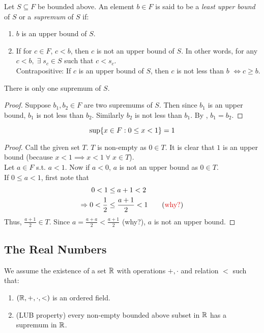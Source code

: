\documentclass[12pt]{article}
\begin{document}
\begin{defn} \label{defn:supremum}
    Let $S \subseteq F$ be bounded above. An element $b \in F$ is said to be a \emph{least upper bound} of $S$ or a \emph{supremum} of $S$ if:
    \begin{enumerate}[label=(\alph*)]
        \item $b$ is an upper bound of $S$.
        \item If for $c \in F$, $c < b$, then $c$ is not an upper bound of $S$. In other words, for any $c < b, \;\exists\; s_{c} \in S$ such that $c < s_{c}$. \\
        Contrapositive: If $c$ is an upper bound of $S$, then $c$ is not less than $b$ $\iff c \geq b$.
    \end{enumerate}
\end{defn}
\begin{rem}
    There is only one supremum of $S$.
\end{rem}
\begin{proof}
    Suppose $b_{1}, b_{2} \in F$ are two supremums of $S$. Then since $b_{1}$ is an upper bound, $b_{1}$ is not less than $b_{2}$. Similarly $b_{2}$ is not less than $b_{1}$. By , $b_{1} = b_{2}$.
\end{proof}
\begin{example}
    \[
        \sup \set{x \in F : 0 \leq x < 1 } = 1
    \]
\end{example}
\begin{proof}
    Call the given set $T$. $T$ is non-empty as $0 \in T$. It is clear that $1$ is an upper bound (because $x < 1 \implies x < 1 \;\forall\; x \in T$). \\
    Let $a \in F$ s.t. $a < 1$. Now if $a < 0$, $a$ is not an upper bound as $0 \in T$. \\
    If $0 \leq a < 1$, first note that
    \begin{align*}
        0 < 1 &\leq a + 1 < 2 \\
        \implies 0 < \frac{1}{2} &\leq \frac{a+1}{2} < 1 \tag{\textcolor{red!85!black}{why?}}
    \end{align*}
    Thus, $\frac{a + 1}{2} \in T$.
    Since $a = \frac{a + a}{2} < \frac{a + 1}{2}$ (\textcolor{red!85!black}{why?}), $a$ is not an upper bound.
\end{proof}

\subsection{The Real Numbers}
We assume the existence of a set $\mathbb{R}$ with operations $+, \cdot$ and relation $<$ such that:
\begin{enumerate}[label=(\alph*)]
    \item $(\mathbb{R}, +, \cdot, <)$ is an ordered field.
    \item (LUB property) every non-empty bounded above subset in $\mathbb{R}$ has a supremum in $\mathbb{R}$.
\end{enumerate}
\end{document}
